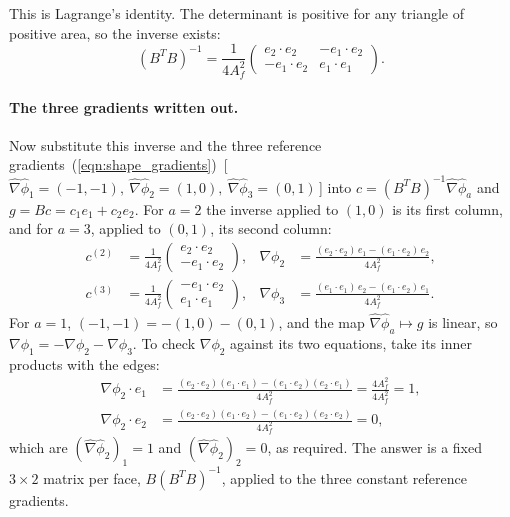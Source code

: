 This is Lagrange's identity. The determinant is positive for any triangle of positive area, so the inverse exists:
\begin{equation*}
(B^TB)^{-1} = \frac{1}{4A_f^2}\begin{pmatrix} e_2\cdot e_2 & -e_1\cdot e_2 \\ -e_1\cdot e_2 & e_1\cdot e_1\end{pmatrix} .
\end{equation*}

\paragraph{The three gradients written out.} Now substitute this inverse and the three reference gradients~(\ref{eqn:shape_gradients})~[\,$\hat\nabla\hat\phi_1 = (-1,-1),\ \hat\nabla\hat\phi_2 = (1,0),\ \hat\nabla\hat\phi_3 = (0,1)$\,] into $c = (B^TB)^{-1}\hat\nabla\hat\phi_a$ and $g = Bc = c_1 e_1 + c_2 e_2$. For $a = 2$ the inverse applied to $(1, 0)$ is its first column, and for $a = 3$, applied to $(0, 1)$, its second column:
\begin{align*}
c^{(2)} &= \frac{1}{4A_f^2}\begin{pmatrix} e_2\cdot e_2 \\ -e_1\cdot e_2\end{pmatrix}, & \nabla\phi_2 &= \frac{(e_2\cdot e_2)\, e_1 - (e_1\cdot e_2)\, e_2}{4A_f^2} , \\
c^{(3)} &= \frac{1}{4A_f^2}\begin{pmatrix} -e_1\cdot e_2 \\ e_1\cdot e_1\end{pmatrix}, & \nabla\phi_3 &= \frac{(e_1\cdot e_1)\, e_2 - (e_1\cdot e_2)\, e_1}{4A_f^2} .
\end{align*}
For $a = 1$, $(-1, -1) = -(1, 0) - (0, 1)$, and the map $\hat\nabla\hat\phi_a \mapsto g$ is linear, so $\nabla\phi_1 = -\nabla\phi_2 - \nabla\phi_3$. To check $\nabla\phi_2$ against its two equations, take its inner products with the edges:
\begin{align*}
\nabla\phi_2\cdot e_1 &= \frac{(e_2\cdot e_2)(e_1\cdot e_1) - (e_1\cdot e_2)(e_2\cdot e_1)}{4A_f^2} = \frac{4A_f^2}{4A_f^2} = 1 , \\
\nabla\phi_2\cdot e_2 &= \frac{(e_2\cdot e_2)(e_1\cdot e_2) - (e_1\cdot e_2)(e_2\cdot e_2)}{4A_f^2} = 0 ,
\end{align*}
which are $(\hat\nabla\hat\phi_2)_1 = 1$ and $(\hat\nabla\hat\phi_2)_2 = 0$, as required. The answer is a fixed $3\times 2$ matrix per face, $B(B^TB)^{-1}$, applied to the three constant reference gradients.
